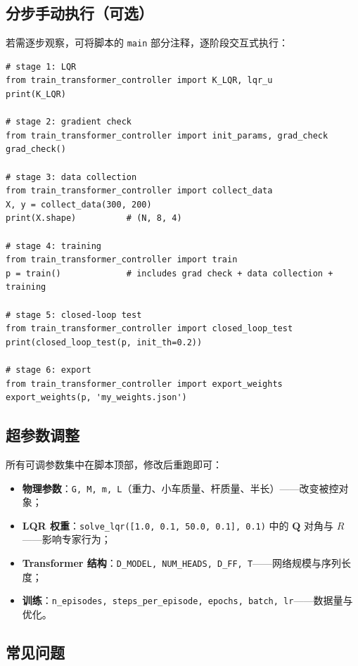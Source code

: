 \documentclass[11pt,a4paper]{article}
\begin{document}
\subsection{分步手动执行（可选）}

若需逐步观察，可将脚本的 \texttt{main} 部分注释，逐阶段交互式执行：

\begin{lstlisting}
# stage 1: LQR
from train_transformer_controller import K_LQR, lqr_u
print(K_LQR)

# stage 2: gradient check
from train_transformer_controller import init_params, grad_check
grad_check()

# stage 3: data collection
from train_transformer_controller import collect_data
X, y = collect_data(300, 200)
print(X.shape)          # (N, 8, 4)

# stage 4: training
from train_transformer_controller import train
p = train()             # includes grad check + data collection + training

# stage 5: closed-loop test
from train_transformer_controller import closed_loop_test
print(closed_loop_test(p, init_th=0.2))

# stage 6: export
from train_transformer_controller import export_weights
export_weights(p, 'my_weights.json')
\end{lstlisting}

\subsection{超参数调整}

所有可调参数集中在脚本顶部，修改后重跑即可：

\begin{itemize}
    \item \textbf{物理参数}：\texttt{G, M, m, L}（重力、小车质量、杆质量、半长）——改变被控对象；
    \item \textbf{LQR 权重}：\texttt{solve\_lqr([1.0, 0.1, 50.0, 0.1], 0.1)} 中的 $\mathbf Q$ 对角与 $R$——影响专家行为；
    \item \textbf{Transformer 结构}：\texttt{D\_MODEL, NUM\_HEADS, D\_FF, T}——网络规模与序列长度；
    \item \textbf{训练}：\texttt{n\_episodes, steps\_per\_episode, epochs, batch, lr}——数据量与优化。
\end{itemize}

\subsection{常见问题}
\end{document}
